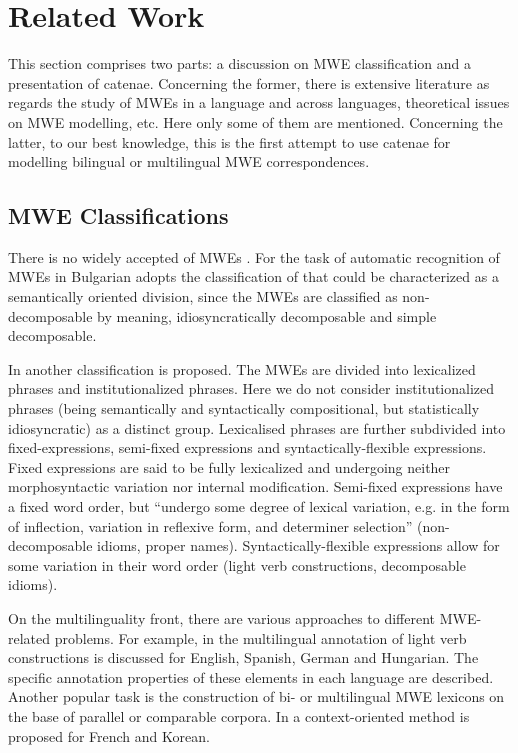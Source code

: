 \documentclass[output=paper]{langsci/langscibook}
\begin{document}
\section{Related Work}
\label{RelatedWork}

This section comprises two parts: a discussion on MWE classification and a
presentation of catenae. Concerning the former, there is extensive
literature as regards the study of MWEs in a language and across languages,
theoretical issues on MWE modelling, etc. Here only some of them are
mentioned. Concerning the latter, to our best knowledge, this is the first
attempt to use catenae for modelling bilingual or multilingual MWE
correspondences.

\subsection{MWE Classifications}

There is no widely accepted  of MWEs \citep{Kordoni2012}. For
the task of automatic recognition of MWEs in Bulgarian \cite{Stoyanova}
adopts the classification of \cite{baldwin2003} that could be characterized
as a semantically oriented division, since the MWEs are classified as
non-decomposable by meaning, idiosyncratically decomposable and simple
decomposable.

In \citet{Sag:2002} another classification is proposed. The MWEs are divided
into lexicalized phrases and institutionalized phrases. Here we do not
consider institutionalized phrases (being semantically and syntactically
compositional, but statistically idiosyncratic) as a distinct group.
Lexicalised phrases are further subdivided into fixed-expressions,
semi-fixed expressions and syntactically-flexible expressions. Fixed
expressions are said to be fully lexicalized and undergoing neither
morphosyntactic variation nor internal modification. Semi-fixed expressions
have a fixed word order, but “undergo some degree of lexical variation,
e.g. in the form of inflection, variation in reflexive form, and determiner
selection” \citet[4]{Sag:2002} (non-decomposable idioms, proper names).
Syntactically-flexible expressions allow for some variation in their word
order (light verb constructions, decomposable idioms).

On the multilinguality front, there are various approaches to different
MWE-related problems. For example, in \citet{RCZ14.331} the multilingual
annotation of light verb constructions is discussed for English, Spanish,
German and Hungarian. The specific annotation properties of these elements
in each language are described. Another popular task is the construction of
bi- or multilingual MWE lexicons on the base of parallel or comparable
corpora. In \citet{Hyeong-WonSeo} a context-oriented method is proposed for
French and Korean.
\end{document}
